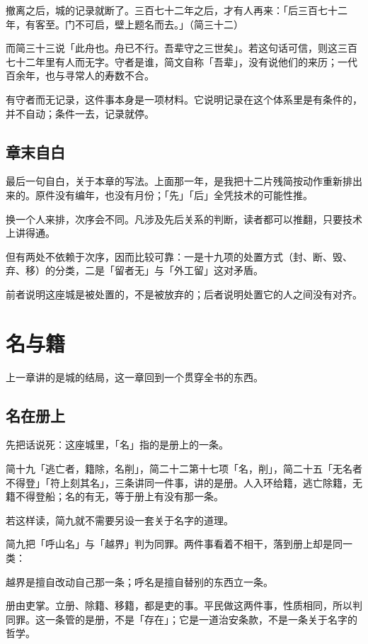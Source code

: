 撤离之后，城的记录就断了。三百七十二年之后，才有人再来：「后三百七十二年，有客至。门不可启，壁上题名而去。」（简三十二）

而简三十三说「此舟也。舟已不行。吾辈守之三世矣」。若这句话可信，则这三百七十二年里有人而无字。守者是谁，简文自称「吾辈」，没有说他们的来历；一代百余年，也与寻常人的寿数不合。

有守者而无记录，这件事本身是一项材料。它说明记录在这个体系里是有条件的，并不自动；条件一去，记录就停。

\section{章末自白}

最后一句自白，关于本章的写法。上面那一年，是我把十二片残简按动作重新排出来的。原件没有编年，也没有月份；「先」「后」全凭技术的可能性推。

换一个人来排，次序会不同。凡涉及先后关系的判断，读者都可以推翻，只要技术上讲得通。

但有两处不依赖于次序，因而比较可靠：一是十九项的处置方式（封、断、毁、弃、移）的分类，二是「留者无」与「外工留」这对矛盾。

前者说明这座城是被处置的，不是被放弃的；后者说明处置它的人之间没有对齐。

\chapter{名与籍}

上一章讲的是城的结局，这一章回到一个贯穿全书的东西。

\section{名在册上}

先把话说死：这座城里，「名」指的是册上的一条。

简十九「逃亡者，籍除，名削」，简二十二第十七项「名，削」，简二十五「无名者不得登」「符上刻其名」，三条讲同一件事，讲的是册。人入环给籍，逃亡除籍，无籍不得登船；名的有无，等于册上有没有那一条。

若这样读，简九就不需要另设一套关于名字的道理。

简九把「呼山名」与「越界」判为同罪。两件事看着不相干，落到册上却是同一类：

越界是擅自改动自己那一条；呼名是擅自替别的东西立一条。

册由吏掌。立册、除籍、移籍，都是吏的事。平民做这两件事，性质相同，所以判同罪。这一条管的是册，不是「存在」；它是一道治安条款，不是一条关于名字的哲学。

